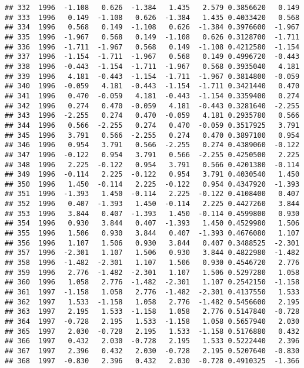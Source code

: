 \documentclass[]{article}
\begin{document}
\begin{verbatim}
## 332  1996  -1.108   0.626  -1.384   1.435   2.579 0.3856620   0.149
## 333  1996   0.149  -1.108   0.626  -1.384   1.435 0.4033420   0.568
## 334  1996   0.568   0.149  -1.108   0.626  -1.384 0.3976600  -1.967
## 335  1996  -1.967   0.568   0.149  -1.108   0.626 0.3128700  -1.711
## 336  1996  -1.711  -1.967   0.568   0.149  -1.108 0.4212580  -1.154
## 337  1996  -1.154  -1.711  -1.967   0.568   0.149 0.4996720  -0.443
## 338  1996  -0.443  -1.154  -1.711  -1.967   0.568 0.3935040   4.181
## 339  1996   4.181  -0.443  -1.154  -1.711  -1.967 0.3814800  -0.059
## 340  1996  -0.059   4.181  -0.443  -1.154  -1.711 0.3421440   0.470
## 341  1996   0.470  -0.059   4.181  -0.443  -1.154 0.3359400   0.274
## 342  1996   0.274   0.470  -0.059   4.181  -0.443 0.3281640  -2.255
## 343  1996  -2.255   0.274   0.470  -0.059   4.181 0.2935780   0.566
## 344  1996   0.566  -2.255   0.274   0.470  -0.059 0.3517925   3.791
## 345  1996   3.791   0.566  -2.255   0.274   0.470 0.3897100   0.954
## 346  1996   0.954   3.791   0.566  -2.255   0.274 0.4389060  -0.122
## 347  1996  -0.122   0.954   3.791   0.566  -2.255 0.4250500   2.225
## 348  1996   2.225  -0.122   0.954   3.791   0.566 0.4201380  -0.114
## 349  1996  -0.114   2.225  -0.122   0.954   3.791 0.4030540   1.450
## 350  1996   1.450  -0.114   2.225  -0.122   0.954 0.4347920  -1.393
## 351  1996  -1.393   1.450  -0.114   2.225  -0.122 0.4108400   0.407
## 352  1996   0.407  -1.393   1.450  -0.114   2.225 0.4427260   3.844
## 353  1996   3.844   0.407  -1.393   1.450  -0.114 0.4599800   0.930
## 354  1996   0.930   3.844   0.407  -1.393   1.450 0.4529980   1.506
## 355  1996   1.506   0.930   3.844   0.407  -1.393 0.4676080   1.107
## 356  1996   1.107   1.506   0.930   3.844   0.407 0.3488525  -2.301
## 357  1996  -2.301   1.107   1.506   0.930   3.844 0.4822980  -1.482
## 358  1996  -1.482  -2.301   1.107   1.506   0.930 0.4546720   2.776
## 359  1996   2.776  -1.482  -2.301   1.107   1.506 0.5297280   1.058
## 360  1996   1.058   2.776  -1.482  -2.301   1.107 0.2542150  -1.158
## 361  1997  -1.158   1.058   2.776  -1.482  -2.301 0.4137550   1.533
## 362  1997   1.533  -1.158   1.058   2.776  -1.482 0.5456600   2.195
## 363  1997   2.195   1.533  -1.158   1.058   2.776 0.5147840  -0.728
## 364  1997  -0.728   2.195   1.533  -1.158   1.058 0.5657940   2.030
## 365  1997   2.030  -0.728   2.195   1.533  -1.158 0.5176880   0.432
## 366  1997   0.432   2.030  -0.728   2.195   1.533 0.5222440   2.396
## 367  1997   2.396   0.432   2.030  -0.728   2.195 0.5207640  -0.830
## 368  1997  -0.830   2.396   0.432   2.030  -0.728 0.4910325  -1.366

\end{verbatim}
\end{document}
